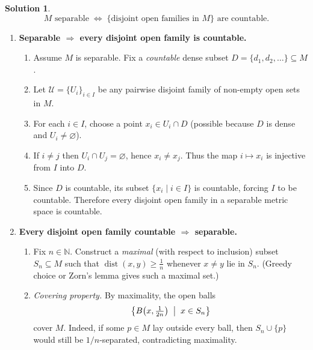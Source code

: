 \documentclass[12pt]{article}
\theoremstyle{definition} %
\newtheorem{solution}{Solution}
\theoremstyle{plain} %
\begin{document}
    \begin{solution}
    \[
       M\text{ separable}\;\Longleftrightarrow\;
       \bigl\{\text{disjoint open families in }M\bigr\}\text{ are countable}.
    \]
    
    \begin{enumerate}[]
    \item \textbf{Separable \(\boldsymbol{\Rightarrow}\) every disjoint open family is countable.}
    
    \begin{enumerate}[]
    \item Assume \(M\) is separable.  
          Fix a \emph{countable} dense subset \(D=\{d_1,d_2,\dots\}\subseteq M\).
    
    \item Let \(\mathcal{U}=\{U_i\}_{i\in I}\) be any pairwise disjoint family of non-empty open sets in \(M\).
    
    \item For each \(i\in I\), choose a point \(x_i\in U_i\cap D\)  
          (possible because \(D\) is dense and \(U_i\neq\varnothing\)).
    
    \item If \(i\neq j\) then \(U_i\cap U_j=\varnothing\), hence \(x_i\neq x_j\).  
          Thus the map \(i\mapsto x_i\) is injective from \(I\) into \(D\).
    
    \item Since \(D\) is countable, its subset \(\{x_i\mid i\in I\}\) is countable, forcing \(I\) to be countable.  
          Therefore every disjoint open family in a separable metric space is countable.
    \end{enumerate}
    
    \item \textbf{Every disjoint open family countable \(\boldsymbol{\Rightarrow}\) separable.}
    
    \begin{enumerate}[]
    \item Fix \(n\in\mathbb{N}\).  
          Construct a \emph{maximal} (with respect to inclusion) subset \(S_n\subseteq M\) such that  
          \(\operatorname{dist}(x,y)\ge \tfrac1n\) whenever \(x\neq y\) lie in \(S_n\).  
          (Greedy choice or Zorn’s lemma gives such a maximal set.)
    
    \item \emph{Covering property.}  
          By maximality, the open balls
          \[
            \bigl\{B\bigl(x,\tfrac1{2n}\bigr)\;\bigm|\;x\in S_n\bigr\}
          \]
          cover \(M\).  
          Indeed, if some \(p\in M\) lay outside every ball, then  
          \(S_n\cup\{p\}\) would still be \(1/n\)-separated, contradicting maximality.
    

\end{enumerate}
\end{enumerate}
\end{solution}
\end{document}

